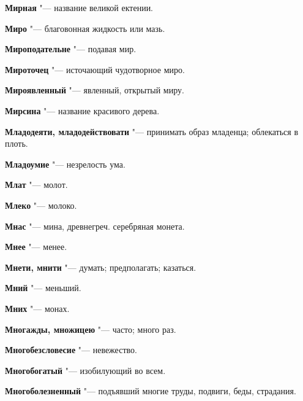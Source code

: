 \begin{mymulticols}{2}
\noindent\textbf{Мирная} "--- название великой ектении. 




\noindent\textbf{Миро} "--- благовонная жидкость или мазь. 




\noindent\textbf{Мироподательне} "--- подавая мир. 




\noindent\textbf{Мироточец} "--- источающий чудотворное миро. 




\noindent\textbf{Мироявленный} "--- явленный, открытый миру. 




\noindent\textbf{Мирсина} "--- название красивого дерева. 




\noindent\textbf{Младодеяти, младодействовати} "--- принимать образ младенца; облекаться в плоть. 




\noindent\textbf{Младоумие} "--- незрелость ума. 




\noindent\textbf{Млат} "--- молот. 




\noindent\textbf{Млеко} "--- молоко. 




\noindent\textbf{Мнас} "--- мина, древнегреч. серебряная монета. 




\noindent\textbf{Мнее} "--- менее. 




\noindent\textbf{Мнети, мнити} "--- думать; предполагать; казаться. 




\noindent\textbf{Мний} "--- меньший. 




\noindent\textbf{Мних} "--- монах. 




\noindent\textbf{Многажды, множицею} "--- часто; много раз. 




\noindent\textbf{Многобезсловесие} "--- невежество. 




\noindent\textbf{Многобогатый} "--- изобилующий во всем. 




\noindent\textbf{Многоболезненный} "--- подъявший многие труды, подвиги, беды, страдания. 





\end{mymulticols}
